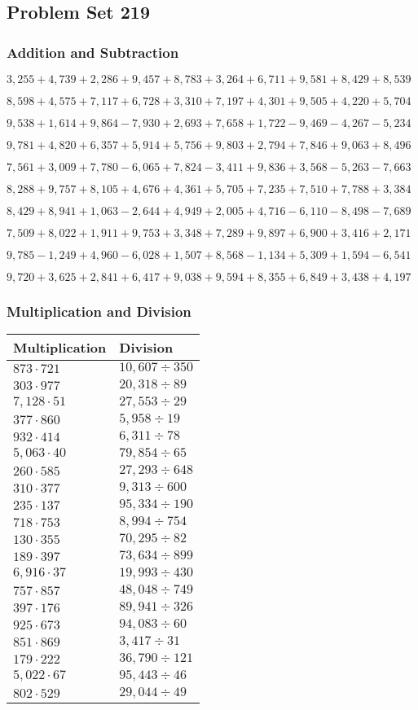 \hypertarget{problem-set-219}{%
\subsection{Problem Set 219}\label{problem-set-219}}

\hypertarget{addition-and-subtraction}{%
\subsubsection{Addition and
Subtraction}\label{addition-and-subtraction}}

\(3,255+4,739+2,286+9,457+8,783+3,264+6,711+9,581+8,429+8,539\)

\(8,598+4,575+7,117+6,728+3,310+7,197+4,301+9,505+4,220+5,704\)

\(9,538+1,614+9,864-7,930+2,693+7,658+1,722-9,469-4,267-5,234\)

\(9,781+4,820+6,357+5,914+5,756+9,803+2,794+7,846+9,063+8,496\)

\(7,561+3,009+7,780-6,065+7,824-3,411+9,836+3,568-5,263-7,663\)

\(8,288+9,757+8,105+4,676+4,361+5,705+7,235+7,510+7,788+3,384\)

\(8,429+8,941+1,063-2,644+4,949+2,005+4,716-6,110-8,498-7,689\)

\(7,509+8,022+1,911+9,753+3,348+7,289+9,897+6,900+3,416+2,171\)

\(9,785-1,249+4,960-6,028+1,507+8,568-1,134+5,309+1,594-6,541\)

\(9,720+3,625+2,841+6,417+9,038+9,594+8,355+6,849+3,438+4,197\)

\hypertarget{multiplication-and-division}{%
\subsubsection{Multiplication and
Division}\label{multiplication-and-division}}

\begin{longtable}[]{@{}ll@{}}
\toprule
Multiplication & Division\tabularnewline
\midrule
\endhead
\(873\cdot721\) & \(10,607÷350\)\tabularnewline
\(303\cdot977\) & \(20,318÷89\)\tabularnewline
\(7,128\cdot51\) & \(27,553÷29\)\tabularnewline
\(377\cdot860\) & \(5,958÷19\)\tabularnewline
\(932\cdot414\) & \(6,311÷78\)\tabularnewline
\(5,063\cdot40\) & \(79,854÷65\)\tabularnewline
\(260\cdot585\) & \(27,293÷648\)\tabularnewline
\(310\cdot377\) & \(9,313÷600\)\tabularnewline
\(235\cdot137\) & \(95,334÷190\)\tabularnewline
\(718\cdot753\) & \(8,994÷754\)\tabularnewline
\(130\cdot355\) & \(70,295÷82\)\tabularnewline
\(189\cdot397\) & \(73,634÷899\)\tabularnewline
\(6,916\cdot37\) & \(19,993÷430\)\tabularnewline
\(757\cdot857\) & \(48,048÷749\)\tabularnewline
\(397\cdot176\) & \(89,941÷326\)\tabularnewline
\(925\cdot673\) & \(94,083÷60\)\tabularnewline
\(851\cdot869\) & \(3,417÷31\)\tabularnewline
\(179\cdot222\) & \(36,790÷121\)\tabularnewline
\(5,022\cdot67\) & \(95,443÷46\)\tabularnewline
\(802\cdot529\) & \(29,044÷49\)\tabularnewline
\bottomrule
\end{longtable}
